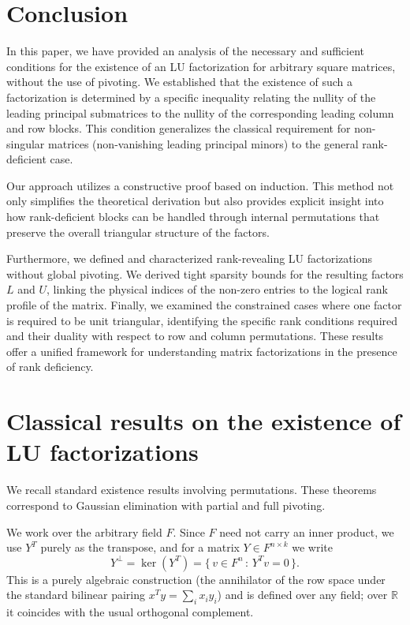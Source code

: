 \documentclass[10pt,twoside]{siamart1116}
\newcommand{\by}{\times}
\numberwithin{theorem}{section}
\begin{document}
\section{Conclusion}

In this paper, we have provided an analysis of the necessary and sufficient conditions for the existence of an LU factorization for arbitrary square matrices, without the use of pivoting. We established that the existence of such a factorization is determined by a specific inequality relating the nullity of the leading principal submatrices to the nullity of the corresponding leading column and row blocks. This condition generalizes the classical requirement for non-singular matrices (non-vanishing leading principal minors) to the general rank-deficient case.

Our approach utilizes a constructive proof based on induction. This method not only simplifies the theoretical derivation but also provides explicit insight into how rank-deficient blocks can be handled through internal permutations that preserve the overall triangular structure of the factors.

Furthermore, we defined and characterized rank-revealing LU factorizations without global pivoting. We derived tight sparsity bounds for the resulting factors $L$ and $U$, linking the physical indices of the non-zero entries to the logical rank profile of the matrix. Finally, we examined the constrained cases where one factor is required to be unit triangular, identifying the specific rank conditions required and their duality with respect to row and column permutations. These results offer a unified framework for understanding matrix factorizations in the presence of rank deficiency.

\appendix

\section{Classical results on the existence of LU factorizations}\label{sec:classical}

We recall standard existence results involving permutations. These theorems correspond to Gaussian elimination with partial and full pivoting.

We work over the arbitrary field $F$. Since $F$ need not carry an inner product, we use $Y^T$ purely as the transpose, and for a matrix $Y \in F^{n \by k}$ we write
\[ Y^\perp = \ker(Y^T) = \{\, v \in F^n \,:\, Y^T v = 0 \,\}. \]
This is a purely algebraic construction (the annihilator of the row space under the standard bilinear pairing $x^T y = \sum_i x_i y_i$) and is defined over any field; over $\mathbb{R}$ it coincides with the usual orthogonal complement.
\end{document}
